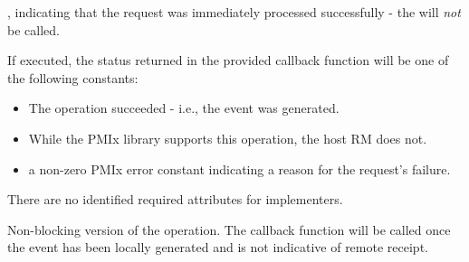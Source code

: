 \begin{arglist}
\end{arglist}

\returnsimplenb

\returnstart
\begin{constantdesc}
\item {}, indicating that the request was immediately processed successfully - the  will \textit{not} be called.
\end{constantdesc}
\returnend

If executed, the status returned in the provided callback function will be one of the following constants:

\begin{itemize}
\item {} The operation succeeded - i.e., the  event was generated.
\item {} While the \ac{PMIx} library supports this operation, the host \ac{RM} does not.
\item a non-zero \ac{PMIx} error constant indicating a reason for the request's failure.
\end{itemize}


\reqattrstart
There are no identified required attributes for implementers.

\reqattrend

\descr

Non-blocking version of the  operation. The callback function will be called once the event has been locally generated and is not indicative of remote receipt.


